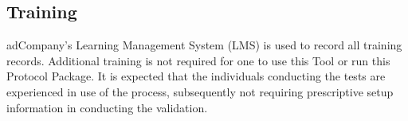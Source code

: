 \subsection{Training}
adCompany's Learning Management System (LMS) is used to record all training records.
Additional training is not required for one to use this Tool or run this
Protocol Package.  It is expected that the individuals conducting the tests are
experienced in use of the process, subsequently not requiring prescriptive setup
information in conducting the validation.

